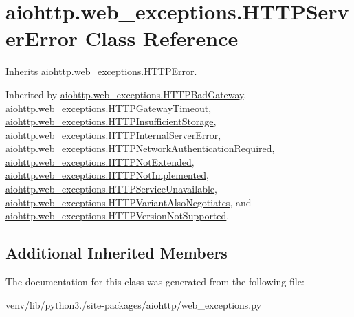 \hypertarget{classaiohttp_1_1web__exceptions_1_1_h_t_t_p_server_error}{}\section{aiohttp.\+web\+\_\+exceptions.\+H\+T\+T\+P\+Server\+Error Class Reference}
\label{classaiohttp_1_1web__exceptions_1_1_h_t_t_p_server_error}


Inherits \hyperlink{classaiohttp_1_1web__exceptions_1_1_h_t_t_p_error}{aiohttp.\+web\+\_\+exceptions.\+H\+T\+T\+P\+Error}.



Inherited by \hyperlink{classaiohttp_1_1web__exceptions_1_1_h_t_t_p_bad_gateway}{aiohttp.\+web\+\_\+exceptions.\+H\+T\+T\+P\+Bad\+Gateway}, \hyperlink{classaiohttp_1_1web__exceptions_1_1_h_t_t_p_gateway_timeout}{aiohttp.\+web\+\_\+exceptions.\+H\+T\+T\+P\+Gateway\+Timeout}, \hyperlink{classaiohttp_1_1web__exceptions_1_1_h_t_t_p_insufficient_storage}{aiohttp.\+web\+\_\+exceptions.\+H\+T\+T\+P\+Insufficient\+Storage}, \hyperlink{classaiohttp_1_1web__exceptions_1_1_h_t_t_p_internal_server_error}{aiohttp.\+web\+\_\+exceptions.\+H\+T\+T\+P\+Internal\+Server\+Error}, \hyperlink{classaiohttp_1_1web__exceptions_1_1_h_t_t_p_network_authentication_required}{aiohttp.\+web\+\_\+exceptions.\+H\+T\+T\+P\+Network\+Authentication\+Required}, \hyperlink{classaiohttp_1_1web__exceptions_1_1_h_t_t_p_not_extended}{aiohttp.\+web\+\_\+exceptions.\+H\+T\+T\+P\+Not\+Extended}, \hyperlink{classaiohttp_1_1web__exceptions_1_1_h_t_t_p_not_implemented}{aiohttp.\+web\+\_\+exceptions.\+H\+T\+T\+P\+Not\+Implemented}, \hyperlink{classaiohttp_1_1web__exceptions_1_1_h_t_t_p_service_unavailable}{aiohttp.\+web\+\_\+exceptions.\+H\+T\+T\+P\+Service\+Unavailable}, \hyperlink{classaiohttp_1_1web__exceptions_1_1_h_t_t_p_variant_also_negotiates}{aiohttp.\+web\+\_\+exceptions.\+H\+T\+T\+P\+Variant\+Also\+Negotiates}, and \hyperlink{classaiohttp_1_1web__exceptions_1_1_h_t_t_p_version_not_supported}{aiohttp.\+web\+\_\+exceptions.\+H\+T\+T\+P\+Version\+Not\+Supported}.

\subsection*{Additional Inherited Members}


The documentation for this class was generated from the following file\+:\begin{DoxyCompactItemize}
\item 
venv/lib/python3./site-\/packages/aiohttp/web\+\_\+exceptions.\+py\end{DoxyCompactItemize}
